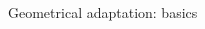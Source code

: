 \begin{frame}[c]{Geometrical adaptation: basics}
\begin{columns}[t]
\begin{column}{0.45\textwidth}
\begin{figure}
			\end{figure}
		\end{column}
	\end{columns}
\end{frame}



